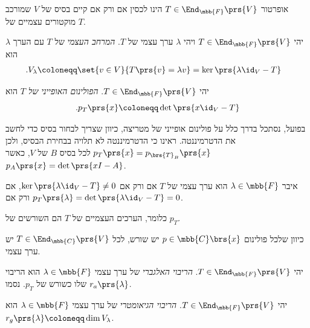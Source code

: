 \documentclass[a4paper,10pt,twoside,openany]{book}
\begin{document}
\begin{remark}
אופרטור
$T \in \End_{\mbb{F}}\prs{V}$
הינו לכסין אם ורק אם קיים בסיס של
$V$
שמורכב מוקטורים עצמיים של
$T$.
\end{remark}

\begin{definition}
יהי
$T \in \End_{\mbb{F}}\prs{V}$
ויהי
$\lambda$
ערך עצמי של
$T$.
\emph{המרחב העצמי}
של
$T$
עם הערך
$\lambda$
הוא
\begin{align*}
\text{.} V_{\lambda} &\coloneqq \set{v \in V}{T\prs{v} = \lambda v} = \ker\prs{\lambda \id_V - T}
\end{align*}
\end{definition}

\begin{definition}
יהי
$T \in \End_{\mbb{F}}\prs{V}$.
\emph{הפולינום האופייני של
$T$}
הוא
\[\text{.} p_T\prs{x} \coloneqq \det\prs{x \id_V - T}\]
\end{definition}

\begin{remark}
בפועל, נסתכל בדרך כלל על פולינום אופייני של מטריצה, כיוון שצריך לבחור בסיס כדי לחשב את הדטרמיננטה.
ראינו כי הדטרמיננטה לא תלויה בבחירת הבסיס, ולכן
$p_T\prs{x} = p_{\brs{T}_B}\prs{x}$
לכל בסיס
$B$
של
$V$,
כאשר
$p_A\prs{x} = \det\prs{xI - A}$.
\end{remark}

\begin{corollary}
איבר
$\lambda \in \mbb{F}$
הוא ערך עצמי של
$T$
אם ורק אם
$\ker\prs{\lambda \id_V - T} \neq 0$,
אם ורק אם
$p_T\prs{\lambda} = \det\prs{\lambda \id_V - T} = 0$.

כלומר, הערכים העצמיים של
$T$
הם השורשים של
$p_T$.
\end{corollary}

\begin{remark}
כיוון שלכל פולינום
$p \in \mbb{C}\brs{x}$
יש שורש, לכל
$T \in \End_{\mbb{C}}\prs{V}$
יש ערך עצמי.
\end{remark}

\begin{definition}
יהי
$T \in \End_{\mbb{F}}\prs{V}$.
\emph{הריבוי האלגברי}
של ערך עצמי
$\lambda \in \mbb{F}$
הוא הריבוי שלו כשורש של
$p_T$.
נסמו
$r_a\prs{\lambda}$.
\end{definition}

\begin{definition}
יהי
$T \in \End_{\mbb{F}}\prs{V}$.
\emph{הריבוי הגיאומטרי}
של ערך עצמי
$\lambda \in \mbb{F}$
הוא
$r_g\prs{\lambda} \coloneqq \dim V_\lambda$.
\end{definition}
\end{document}
